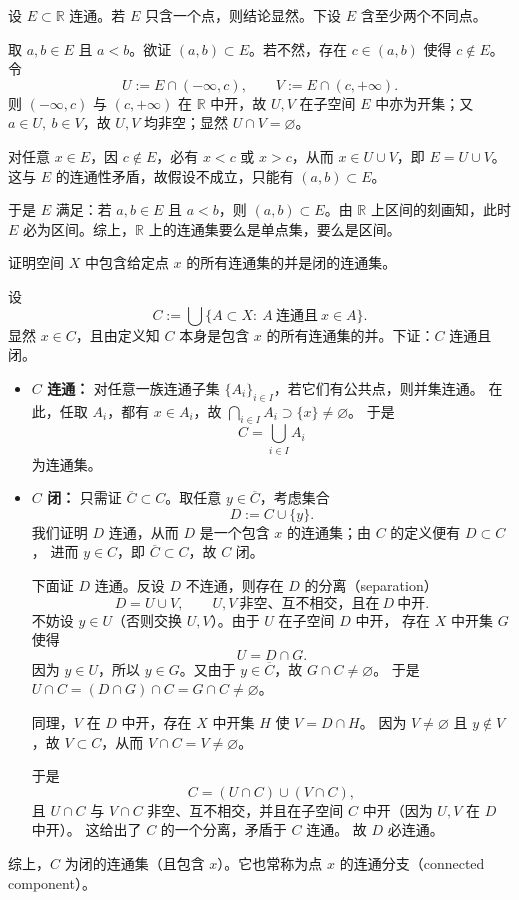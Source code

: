 \begin{solution}
设 $E\subset\mathbb{R}$ 连通。若 $E$ 只含一个点，则结论显然。下设 $E$ 含至少两个不同点。

取 $a,b\in E$ 且 $a<b$。欲证 $(a,b)\subset E$。若不然，存在 $c\in(a,b)$ 使得 $c\notin E$。令
\[
U := E\cap(-\infty,c),\qquad V := E\cap(c,+\infty).
\]
则 $(-\infty,c)$ 与 $(c,+\infty)$ 在 $\mathbb{R}$ 中开，故 $U,V$ 在子空间 $E$ 中亦为开集；又 $a\in U,\ b\in V$，故 $U,V$ 均非空；显然 $U\cap V=\varnothing$。

对任意 $x\in E$，因 $c\notin E$，必有 $x<c$ 或 $x>c$，从而 $x\in U\cup V$，即 $E=U\cup V$。这与 $E$ 的连通性矛盾，故假设不成立，只能有 $(a,b)\subset E$。

于是 $E$ 满足：若 $a,b\in E$ 且 $a<b$，则 $(a,b)\subset E$。由 $\mathbb{R}$ 上区间的刻画知，此时 $E$ 必为区间。综上，$\mathbb{R}$ 上的连通集要么是单点集，要么是区间。
\end{solution}
\begin{homework}[4.1]
证明空间 $X$ 中包含给定点 $x$ 的所有连通集的并是闭的连通集。
\end{homework}
\begin{solution}
设
\[
C:=\bigcup\{A\subset X:\ A\ \text{连通且}\ x\in A\}.
\]
显然 $x\in C$，且由定义知 $C$ 本身是包含 $x$ 的所有连通集的并。下证：$C$ 连通且闭。

\begin{itemize}
  \item \textbf{$C$ 连通：}
  对任意一族连通子集 $\{A_i\}_{i\in I}$，若它们有公共点，则并集连通。
  在此，任取 $A_i$，都有 $x\in A_i$，故 $\bigcap_{i\in I}A_i\supset\{x\}\neq\varnothing$。
  于是
  \[
  C=\bigcup_{i\in I}A_i
  \]
  为连通集。

  \item \textbf{$C$ 闭：}
  只需证 $\overline{C}\subset C$。取任意 $y\in \overline{C}$，考虑集合
  \[
  D:=C\cup\{y\}.
  \]
  我们证明 $D$ 连通，从而 $D$ 是一个包含 $x$ 的连通集；由 $C$ 的定义便有 $D\subset C$，
  进而 $y\in C$，即 $\overline{C}\subset C$，故 $C$ 闭。

  下面证 $D$ 连通。反设 $D$ 不连通，则存在 $D$ 的分离（separation）
  \[
  D=U\cup V,\qquad U,V\ \text{非空、互不相交，且在}\ D\ \text{中开}.
  \]
  不妨设 $y\in U$（否则交换 $U,V$）。由于 $U$ 在子空间 $D$ 中开，
  存在 $X$ 中开集 $G$ 使得
  \[
  U=D\cap G.
  \]
  因为 $y\in U$，所以 $y\in G$。又由于 $y\in \overline{C}$，故 $G\cap C\neq\varnothing$。
  于是 $U\cap C=(D\cap G)\cap C=G\cap C\neq\varnothing$。

  同理，$V$ 在 $D$ 中开，存在 $X$ 中开集 $H$ 使 $V=D\cap H$。
  因为 $V\neq\varnothing$ 且 $y\notin V$，故 $V\subset C$，从而 $V\cap C=V\neq\varnothing$。

  于是
  \[
  C=(U\cap C)\cup (V\cap C),
  \]
  且 $U\cap C$ 与 $V\cap C$ 非空、互不相交，并且在子空间 $C$ 中开（因为 $U,V$ 在 $D$ 中开）。
  这给出了 $C$ 的一个分离，矛盾于 $C$ 连通。
  故 $D$ 必连通。
\end{itemize}

综上，$C$ 为闭的连通集（且包含 $x$）。它也常称为点 $x$ 的连通分支（connected component）。
\end{solution}
